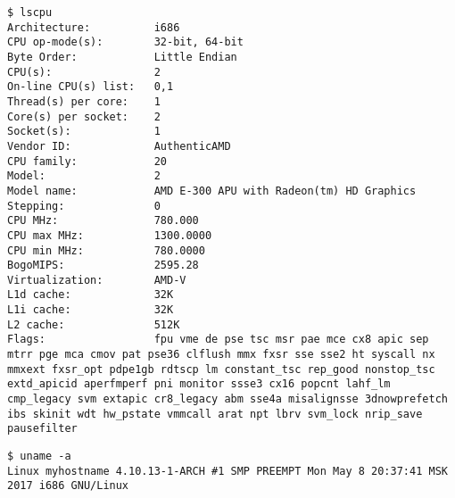 






\begin{lstlisting}[caption=\texttt{lscpu}, label=app:lscpu]
$ lscpu
Architecture:          i686
CPU op-mode(s):        32-bit, 64-bit
Byte Order:            Little Endian
CPU(s):                2
On-line CPU(s) list:   0,1
Thread(s) per core:    1
Core(s) per socket:    2
Socket(s):             1
Vendor ID:             AuthenticAMD
CPU family:            20
Model:                 2
Model name:            AMD E-300 APU with Radeon(tm) HD Graphics
Stepping:              0
CPU MHz:               780.000
CPU max MHz:           1300.0000
CPU min MHz:           780.0000
BogoMIPS:              2595.28
Virtualization:        AMD-V
L1d cache:             32K
L1i cache:             32K
L2 cache:              512K
Flags:                 fpu vme de pse tsc msr pae mce cx8 apic sep mtrr pge mca cmov pat pse36 clflush mmx fxsr sse sse2 ht syscall nx mmxext fxsr_opt pdpe1gb rdtscp lm constant_tsc rep_good nonstop_tsc extd_apicid aperfmperf pni monitor ssse3 cx16 popcnt lahf_lm cmp_legacy svm extapic cr8_legacy abm sse4a misalignsse 3dnowprefetch ibs skinit wdt hw_pstate vmmcall arat npt lbrv svm_lock nrip_save pausefilter
\end{lstlisting}

\begin{lstlisting}[caption=\texttt{uname}, label=app:uname]
$ uname -a
Linux myhostname 4.10.13-1-ARCH #1 SMP PREEMPT Mon May 8 20:37:41 MSK 2017 i686 GNU/Linux
\end{lstlisting}

\clearpage
